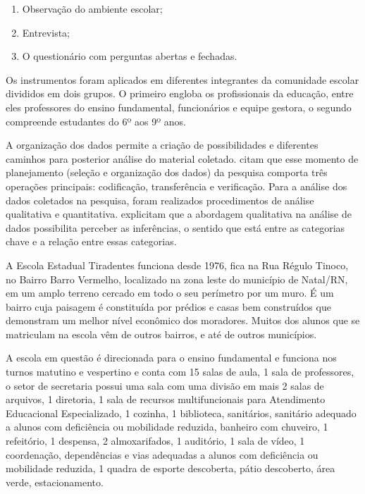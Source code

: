\begin{refsection}
    \begin{enumerate}
        \item Observação do ambiente escolar; 
        \item Entrevista;  
        \item O questionário com perguntas abertas e fechadas. 
    \end{enumerate}

    Os instrumentos foram aplicados em diferentes integrantes da comunidade escolar divididos em dois grupos. O primeiro engloba os profissionais da educação, entre eles professores do ensino fundamental, funcionários e equipe gestora, o segundo compreende estudantes do 6º aos 9º anos. 

    A organização dos dados permite a criação de possibilidades e diferentes caminhos para posterior análise do material coletado. \textcite{LavilleAndDionne1999Construcao} citam que esse momento de planejamento (seleção e organização dos dados) da pesquisa comporta três operações principais: codificação, transferência e verificação. Para a análise dos dados coletados na pesquisa, foram realizados procedimentos de análise qualitativa e quantitativa. \textcite{LavilleAndDionne1999Construcao} explicitam que a abordagem qualitativa na análise de dados possibilita perceber as inferências, o sentido que está entre as categorias chave e a relação entre essas categorias. 

    A Escola Estadual Tiradentes funciona desde 1976, fica na Rua Régulo Tinoco, no Bairro Barro Vermelho, localizado na zona leste do município de Natal/RN, em um amplo terreno cercado em todo o seu perímetro por um muro. É um bairro cuja paisagem é constituída por prédios e casas bem construídos que demonstram um melhor nível econômico dos moradores. Muitos dos alunos que se matriculam na escola vêm de outros bairros, e até de outros municípios.  

    A escola em questão é direcionada para o ensino fundamental e funciona nos turnos matutino e vespertino e conta com 15 salas de aula, 1 sala de professores, o setor de secretaria possui uma sala com uma divisão em mais 2 salas de arquivos, 1 diretoria, 1 sala de recursos multifuncionais para Atendimento Educacional Especializado, 1 cozinha, 1 biblioteca, sanitários, sanitário adequado a alunos com deficiência ou mobilidade reduzida, banheiro com chuveiro, 1 refeitório, 1 despensa, 2 almoxarifados, 1 auditório, 1 sala de vídeo, 1 coordenação, dependências e vias adequadas a alunos com deficiência ou mobilidade reduzida, 1 quadra de esporte descoberta, pátio descoberto, área verde, estacionamento. 


\end{refsection}
